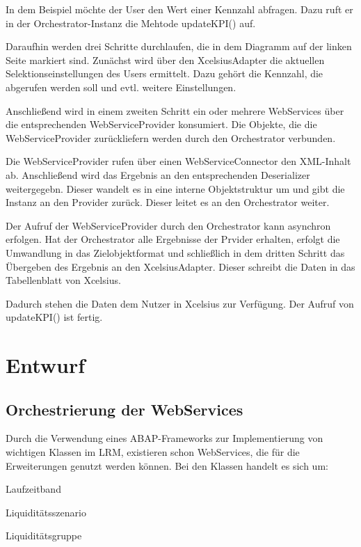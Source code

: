 
In dem Beispiel möchte der User den Wert einer Kennzahl abfragen. Dazu ruft er in der Orchestrator-Instanz die Mehtode updateKPI() auf.

Daraufhin werden drei Schritte durchlaufen, die in dem Diagramm auf der linken Seite markiert sind. Zunächst wird über den XcelsiusAdapter die aktuellen Selektionseinstellungen des Users ermittelt. Dazu gehört die Kennzahl, die abgerufen werden soll und evtl. weitere Einstellungen.

Anschließend wird in einem zweiten Schritt ein oder mehrere WebServices über die entsprechenden WebServiceProvider konsumiert. Die Objekte, die die WebServiceProvider zurückliefern werden durch den Orchestrator verbunden.

Die WebServiceProvider rufen über einen WebServiceConnector den XML-Inhalt ab. Anschließend wird das Ergebnis an den entsprechenden Deserializer weitergegebn. Dieser wandelt es in eine interne Objektstruktur um und gibt die Instanz an den Provider zurück. Dieser leitet es an den Orchestrator weiter.

Der Aufruf der WebServiceProvider durch den Orchestrator kann asynchron erfolgen. Hat der Orchestrator alle Ergebnisse der Prvider erhalten, erfolgt die Umwandlung in das Zielobjektformat und schließlich in dem dritten Schritt das Übergeben des Ergebnis an den XcelsiusAdapter. Dieser schreibt die Daten in das Tabellenblatt von Xcelsius.

Dadurch stehen die Daten dem Nutzer in Xcelsius zur Verfügung. Der Aufruf von updateKPI() ist fertig.

\section{Entwurf}

\subsection{Orchestrierung der WebServices}
Durch die Verwendung eines ABAP-Frameworks zur Implementierung von wichtigen Klassen im LRM, existieren schon WebServices, die für die Erweiterungen genutzt werden können. Bei den Klassen handelt es sich um:

\begin{seList}
\item Laufzeitband
\item Liquiditätsszenario
\item Liquiditätsgruppe
\end{seList}

